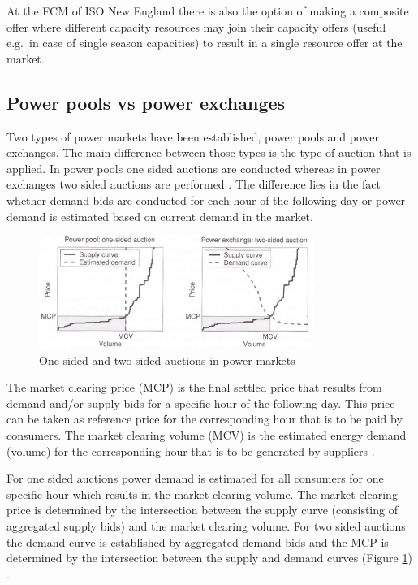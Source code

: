 At the FCM of ISO New England there is also the option of making a composite offer where different capacity resources may join their capacity offers (useful e.g.~in case of single season capacities) to result in a single resource offer at the market. 



\subsection{Power pools vs power exchanges}

Two types of power markets have been established, power pools and power exchanges. The main difference between those types is the type of auction that is applied. In power pools one sided auctions are conducted whereas in power exchanges two sided auctions are performed \cite{weron2007modeling}. The difference lies in the fact whether demand bids are conducted for each hour of the following day or power demand is estimated based on current demand in the market. 

\begin{figure}[htbp]
	\centering
		\includegraphics[width=0.8\textwidth]{figures/data_analysis/power_markets_one_two_sided_auctions.PNG}
	\caption{One sided and two sided auctions in power markets \cite{weron2007modeling}}
	\label{fig:power_markets_one_two_sided_auctions}
\end{figure}

The market clearing price (MCP) is the final settled price that results from demand and/or supply bids for a specific hour of the following day. This price can be taken as reference price for the corresponding hour that is to be paid by consumers. The market clearing volume (MCV) is the estimated energy demand (volume) for the corresponding hour that is to be generated by suppliers \cite{weron2007modeling}. 

For one sided auctions power demand is estimated for all consumers for one specific hour which results in the market clearing volume. The market clearing price is determined by the intersection between the supply curve (consisting of aggregated supply bids) and the market clearing volume. 
For two sided auctions the demand curve is established by aggregated demand bids and the MCP is determined by the intersection between the supply and demand curves (Figure \ref{fig:power_markets_one_two_sided_auctions}) \cite{weron2007modeling}. 

